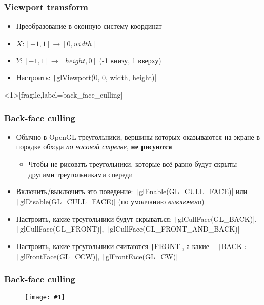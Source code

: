 \documentclass[10pt]{beamer}
\newcommand{\slideimage}[1]{
  \begin{figure}
    \begin{adjustbox}{width=\textwidth, totalheight=\textheight-2\baselineskip-2\baselineskip,keepaspectratio}
      \texttt{[image: \#1]}
    \end{adjustbox}
  \end{figure}
}
\begin{document}
\begin{frame}[fragile]
\frametitle{Viewport transform}
\begin{itemize}
\item Преобразование в оконную систему координат
\item \begin{math}X: [-1, 1] \rightarrow [0, width]\end{math}
\item \begin{math}Y: [-1, 1] \rightarrow [height, 0]\end{math} (-1 внизу, 1 вверху)
\pause
\item Настроить: \texttt|glViewport(0, 0, width, height)|
\end{itemize}
\end{frame}

\begin{frame}<1>[fragile,label=back_face_culling]
\frametitle{Back-face culling}
\begin{itemize}
\item Обычно в OpenGL треугольники, вершины которых оказываются на экране в порядке обхода \textit{по часовой стрелке}, \alert{\textbf{не рисуются}}
\pause
\begin{itemize}
\item Чтобы не рисовать треугольники, которые всё равно будут скрыты другими треугольниками спереди
\end{itemize}
\pause
\item Включить/выключить это поведение: \texttt|glEnable(GL_CULL_FACE)| или \texttt|glDisable(GL_CULL_FACE)| (по умолчанию \textit{выключено})
\pause
\item Настроить, какие треугольники будут скрываться: \texttt|glCullFace(GL_BACK)|, \texttt|glCullFace(GL_FRONT)|, \texttt|glCullFace(GL_FRONT_AND_BACK)|
\pause
\item Настроить, какие треугольники считаются \texttt|FRONT|, а какие -- \texttt|BACK|: \texttt|glFrontFace(GL_CCW)|, \texttt|glFrontFace(GL_CW)|
\end{itemize}
\end{frame}

\begin{frame}
\frametitle{Back-face culling}
\slideimage{back-face-culling.png}
\end{frame}
\end{document}
